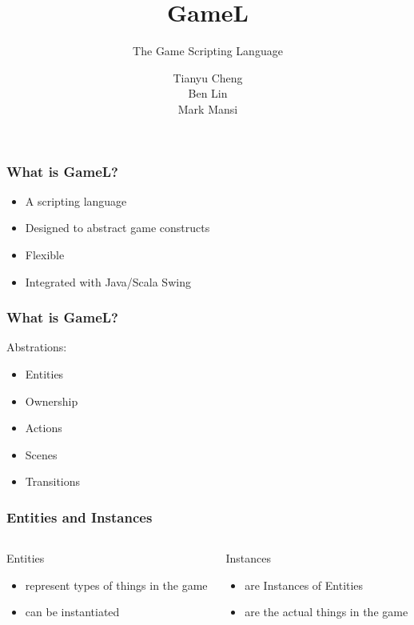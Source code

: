\documentclass{beamer}
\title{GameL}
\subtitle{The Game Scripting Language}
\author{Tianyu Cheng\\ Ben Lin\\ Mark Mansi}
\begin{document}
\begin{frame}
    \maketitle
\end{frame}

\begin{frame}
    \frametitle{What is GameL?}
    \begin{itemize}[<+->]
        \item{A scripting language}
        \item{Designed to abstract game constructs}
        \item{Flexible}
        \item{Integrated with Java/Scala Swing}
    \end{itemize}
\end{frame}

\begin{frame}
    \frametitle{What is GameL?}
    Abstrations:
    \begin{itemize}[<+->]
        \item{Entities}
        \item{Ownership}
        \item{Actions}
        \item{Scenes}
        \item{Transitions}
    \end{itemize}
\end{frame}

\begin{frame}
    \frametitle{Entities and Instances}
    \begin{columns}[T]
    \begin{column}[T]{5cm}
    Entities
    \begin{itemize}[<+->]
        \item{represent types of things in the game}
        \item{can be instantiated}
    \end{itemize}
    \end{column}

    \begin{column}[T]{5cm}
    Instances
    \begin{itemize}[<+->]
        \item{are Instances of Entities}
        \item{are the actual things in the game}
    \end{itemize}
    \end{column}
    \end{columns}
\end{frame}
\end{document}
